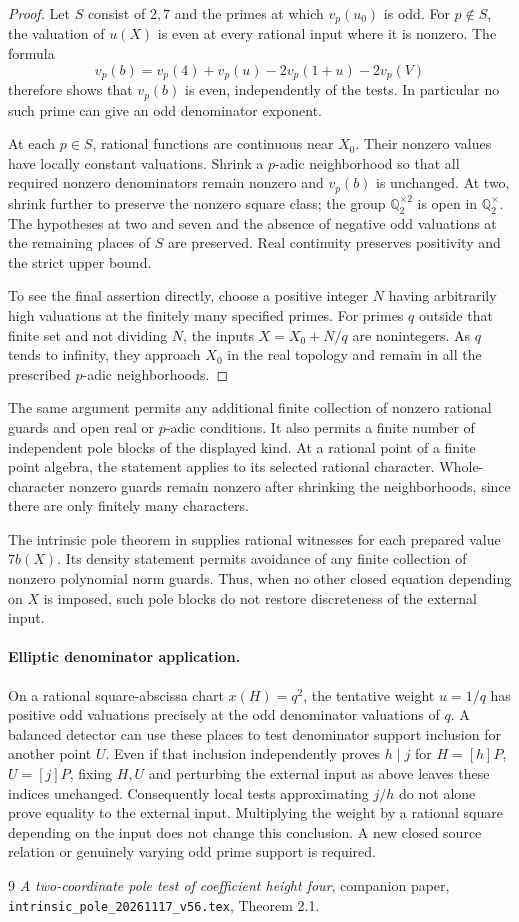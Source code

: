 \documentclass[11pt,a4paper]{article}
\newcommand{\Q}{\mathbb Q}
\begin{document}
\begin{proof}
Let $S$ consist of $2,7$ and the primes at which $v_p(u_0)$ is odd.
For $p\notin S$, the valuation of $u(X)$ is even at every rational
input where it is nonzero. The formula
\[
 v_p(b)=v_p(4)+v_p(u)-2v_p(1+u)-2v_p(V)
\]
therefore shows that $v_p(b)$ is even, independently of the tests.
In particular no such prime can give an odd denominator exponent.

At each $p\in S$, rational functions are continuous near $X_0$.
Their nonzero values have locally constant valuations. Shrink a
$p$-adic neighborhood so that all required nonzero denominators
remain nonzero and $v_p(b)$ is unchanged. At two, shrink further
to preserve the nonzero square class; the group
$\Q_2^{\times2}$ is open in $\Q_2^\times$.
The hypotheses at two and seven and the absence of negative odd
valuations at the remaining places of $S$ are preserved.
Real continuity preserves positivity and the strict upper bound.

To see the final assertion directly, choose a positive integer
$N$ having arbitrarily high valuations at the finitely many
specified primes. For primes $q$ outside that finite set and not
dividing $N$, the inputs $X=X_0+N/q$ are nonintegers. As $q$
tends to infinity, they approach $X_0$ in the real topology and
remain in all the prescribed $p$-adic neighborhoods.
\end{proof}

The same argument permits any additional finite collection of
nonzero rational guards and open real or $p$-adic conditions.
It also permits a finite number of independent pole blocks of
the displayed kind. At a rational point of a finite point
algebra, the statement applies to its selected rational
character. Whole-character nonzero guards remain nonzero after
shrinking the neighborhoods, since there are only finitely many
characters.

The intrinsic pole theorem in \cite[Theorem 2.1]{Intrinsic}
supplies rational witnesses for each prepared value $7b(X)$.
Its density statement permits avoidance of any finite collection
of nonzero polynomial norm guards. Thus, when no other closed
equation depending on $X$ is imposed, such pole blocks do not
restore discreteness of the external input.

\paragraph{Elliptic denominator application.}
On a rational square-abscissa chart $x(H)=q^2$, the tentative
weight $u=1/q$ has positive odd valuations precisely at the
odd denominator valuations of $q$. A balanced detector can use
these places to test denominator support inclusion for another
point $U$. Even if that inclusion independently proves
$h\mid j$ for $H=[h]P$, $U=[j]P$, fixing $H,U$ and perturbing
the external input as above leaves these indices unchanged.
Consequently local tests approximating $j/h$ do not alone
prove equality to the external input. Multiplying the weight by
a rational square depending on the input does not change this
conclusion. A new closed source relation or genuinely varying
odd prime support is required.

\begin{thebibliography}{9}
\emph{A two-coordinate pole test of coefficient
height four}, companion paper,
\nolinkurl{intrinsic_pole_20261117_v56.tex}, Theorem 2.1.
\end{thebibliography}
\end{document}
